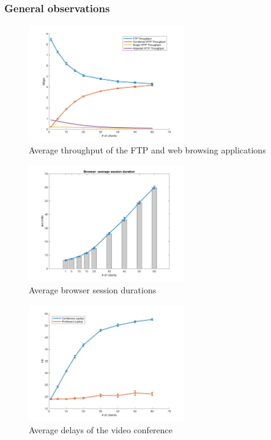 \documentclass[
10pt, %
a4paper, %
oneside, %
headinclude,footinclude, %
BCOR5mm, %
]{scrartcl}
\begin{document}
\subsubsection{General observations}
\begin{figure}[!ht]
  \centering
  \includegraphics[width=0.6\textwidth]{../matlab/images/finalnocctv/Application Throughputs.png}
  \caption{Average throughput of the FTP and web browsing applications} \label{fig:app_throughput}
\end{figure}
\begin{figure}[!ht]
  \centering
  \includegraphics[width=0.6\textwidth]{../matlab/images/finalnocctv/Browser -average session duration.png}
  \caption{Average browser session durations} \label{fig:browser_sess_dur}
\end{figure}
\begin{figure}[!ht]
  \centering
  \includegraphics[width=0.6\textwidth]{../matlab/images/finalnocctv/Application Packet Delays.png}
  \caption{Average delays of the video conference} \label{fig:app_pkt_delay}
\end{figure}
\end{document}
